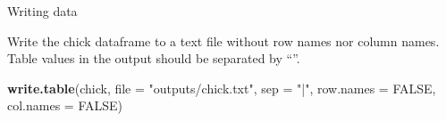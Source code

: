 \documentclass[ignorenonframetext,]{beamer}
\newenvironment{Shaded}{\begin{snugshade}}{\end{snugshade}}
\newcommand{\DataTypeTok}[1]{\textcolor[rgb]{0.13,0.29,0.53}{#1}}
\newcommand{\KeywordTok}[1]{\textcolor[rgb]{0.13,0.29,0.53}{\textbf{#1}}}
\newcommand{\NormalTok}[1]{#1}
\newcommand{\OtherTok}[1]{\textcolor[rgb]{0.56,0.35,0.01}{#1}}
\newcommand{\StringTok}[1]{\textcolor[rgb]{0.31,0.60,0.02}{#1}}
\begin{document}
\begin{frame}[fragile]{Writing data}
\protect\hypertarget{writing-data-9}{}

Write the chick dataframe to a text file without row names nor column
names. Table values in the output should be separated by ``\textbar{}''.

\begin{Shaded}
\begin{Highlighting}[]
\KeywordTok{write.table}\NormalTok{(chick, }\DataTypeTok{file =} \StringTok{"outputs/chick.txt"}\NormalTok{,}
            \DataTypeTok{sep =} \StringTok{"|"}\NormalTok{,}
            \DataTypeTok{row.names =} \OtherTok{FALSE}\NormalTok{,}
            \DataTypeTok{col.names =} \OtherTok{FALSE}\NormalTok{)}
\end{Highlighting}
\end{Shaded}

\end{frame}
\end{document}
